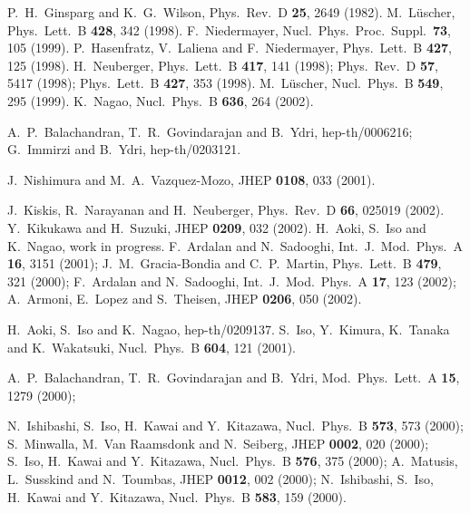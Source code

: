 \documentclass[a4paper,prl,showpacs,twocolumn]{revtex4}
\begin{document}
\begin{thebibliography}{all}
P.~H.~Ginsparg and K.~G.~Wilson,
Phys.\ Rev.\ D {\bf 25}, 2649 (1982).
M.~L\"uscher,
Phys.\ Lett.\ B {\bf 428}, 342 (1998).
F.~Niedermayer,
Nucl.\ Phys.\ Proc.\ Suppl.\  {\bf 73}, 105 (1999).
%
P.~Hasenfratz, V.~Laliena and F.~Niedermayer,
Phys.\ Lett.\ B {\bf 427}, 125 (1998).
H.~Neuberger,
Phys.\ Lett.\ B {\bf 417}, 141 (1998);
Phys.\ Rev.\ D {\bf 57}, 5417 (1998);
Phys.\ Lett.\ B {\bf 427}, 353 (1998).
M.~L\"uscher,
Nucl.\ Phys.\ B {\bf 549}, 295 (1999).
K.~Nagao,
Nucl.\ Phys.\ B {\bf 636}, 264 (2002).

A.~P.~Balachandran, T.~R.~Govindarajan and B.~Ydri,
hep-th/0006216;
%
G.~Immirzi and B.~Ydri,
hep-th/0203121.

J.~Nishimura and M.~A.~Vazquez-Mozo,
JHEP {\bf 0108}, 033 (2001).

%
J.~Kiskis, R.~Narayanan and H.~Neuberger,
Phys.\ Rev.\ D {\bf 66}, 025019 (2002).
Y.~Kikukawa and H.~Suzuki,
JHEP {\bf 0209}, 032 (2002).
H.~Aoki, S.~Iso and K.~Nagao, work in progress.
F.~Ardalan and N.~Sadooghi,
Int.\ J.\ Mod.\ Phys.\ A {\bf 16}, 3151 (2001);
J.~M.~Gracia-Bondia and C.~P.~Martin,
Phys.\ Lett.\ B {\bf 479}, 321 (2000);
F.~Ardalan and N.~Sadooghi,
Int.\ J.\ Mod.\ Phys.\ A {\bf 17}, 123 (2002);
%
A.~Armoni, E.~Lopez and S.~Theisen,
JHEP {\bf 0206}, 050 (2002).

H.~Aoki, S.~Iso and K.~Nagao, 
hep-th/0209137.
S.~Iso, Y.~Kimura, K.~Tanaka and K.~Wakatsuki,
Nucl.\ Phys.\ B {\bf 604}, 121 (2001).

A.~P.~Balachandran, T.~R.~Govindarajan and B.~Ydri,
Mod.\ Phys.\ Lett.\ A {\bf 15}, 1279 (2000);


N.~Ishibashi, S.~Iso, H.~Kawai and Y.~Kitazawa,
Nucl.\ Phys.\ B {\bf 573}, 573 (2000);
S.~Minwalla, M.~Van Raamsdonk and N.~Seiberg,
JHEP {\bf 0002}, 020 (2000);
S.~Iso, H.~Kawai and Y.~Kitazawa,
Nucl.\ Phys.\ B {\bf 576}, 375 (2000);
A.~Matusis, L.~Susskind and N.~Toumbas,
JHEP {\bf 0012}, 002 (2000);
N.~Ishibashi, S.~Iso, H.~Kawai and Y.~Kitazawa,
Nucl.\ Phys.\ B {\bf 583}, 159 (2000).

\end{thebibliography}
\end{document}
